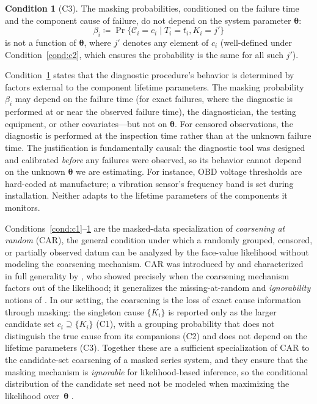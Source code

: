 \documentclass[11pt]{article}
\theoremstyle{definition}
\newtheorem{condition}{Condition}
\theoremstyle{plain}
\renewcommand{\v}[1]{\boldsymbol{#1}}
\newcommand{\btheta}{\v{\theta}}
\begin{document}
\begin{condition}[C3]
\label{cond:c3}
The masking probabilities, conditioned on the failure time and the
component cause of failure, do not depend on the system parameter
$\btheta$:
\begin{equation}
    \beta_i \coloneqq \Pr\{\mathcal{C}_i = c_i \mid T_i = t_i, K_i = j'\}
\end{equation}
is not a function of $\btheta$, where $j'$ denotes any element of $c_i$
(well-defined under Condition~\ref{cond:c2}, which ensures the probability
is the same for all such $j'$).
\end{condition}

Condition~\ref{cond:c3} states that the diagnostic procedure's behavior
is determined by factors external to the component lifetime parameters.
The masking probability $\beta_i$ may depend on the failure time (for
exact failures, where the diagnostic is performed at or near the observed
failure time), the diagnostician, the testing equipment, or other
covariates---but not on $\btheta$.
For censored observations, the diagnostic is performed at the inspection
time rather than at the unknown failure time.
The justification is fundamentally causal: the diagnostic tool was
designed and calibrated \emph{before} any failures were observed, so its
behavior cannot depend on the unknown $\btheta$ we are estimating.
For instance, OBD voltage thresholds are hard-coded at manufacture; a
vibration sensor's frequency band is set during installation.
Neither adapts to the lifetime parameters of the components it monitors.

Conditions~\ref{cond:c1}--\ref{cond:c3} are the masked-data
specialization of \emph{coarsening at random} (CAR), the general
condition under which a randomly grouped, censored, or partially
observed datum can be analyzed by the face-value likelihood without
modeling the coarsening mechanism.
CAR was introduced by \citet{heitjan1991} and characterized in full
generality by \citet{gill1997coarsening}, who showed precisely when the
coarsening mechanism factors out of the likelihood; it generalizes the
missing-at-random and \emph{ignorability} notions of
\citet{little2002statistical}.
In our setting, the coarsening is the loss of exact cause information
through masking: the singleton cause $\{K_i\}$ is reported only as the
larger candidate set $c_i \supseteq \{K_i\}$ (C1), with a grouping
probability that does not distinguish the true cause from its companions
(C2) and does not depend on the lifetime parameters (C3).
Together these are a sufficient specialization of CAR to the
candidate-set coarsening of a masked series system, and they ensure that
the masking mechanism is \emph{ignorable} for likelihood-based inference,
so the conditional distribution of the candidate set need not be modeled
when maximizing the likelihood over~$\btheta$
\citep[see][Ch.~6]{little2002statistical}.
\end{document}
